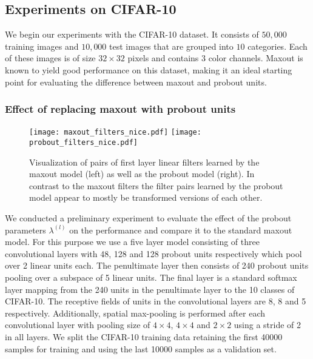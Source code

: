 \documentclass{article} \pdfoutput=1
\begin{document}
\subsection{Experiments on CIFAR-10}
We begin our experiments with the CIFAR-10 \cite{Krizhevsky2009}
dataset. It consists of $50,000$ training images and $10,000$ test
images that are grouped into $10$ categories. Each of these images is
of size $32\times32$ pixels and contains $3$ color channels. Maxout is
known to yield good performance on this dataset, making it an ideal
starting point for evaluating the difference between maxout and
probout units.


\subsubsection{Effect of replacing maxout with probout units}
\label{sect_prelim_eval}
\begin{figure}
\centering
\texttt{[image: maxout\_filters\_nice.pdf]}
\quad
\texttt{[image: probout\_filters\_nice.pdf]}
\caption{Visualization of pairs of first layer linear filters learned by the maxout
  model (left) as well as the probout model (right). In contrast to
  the maxout filters the filter pairs learned by the probout model
  appear to mostly be transformed versions of each other.}
\label{filters_fig}
\end{figure}
We conducted a preliminary experiment to evaluate the effect of the
probout parameters $\lambda^{(l)}$ on the performance and compare it to the
standard maxout model. For this purpose we use a five layer model consisting of
three convolutional layers with 48, 128 and 128 probout units
respectively which pool over 2 linear units each. The penultimate
layer then consists of 240 probout units pooling over a subspace of 5
linear units. The final layer is a standard softmax layer mapping from
the 240 units in the penultimate layer to the 10 classes of CIFAR-10.
The receptive fields of units in the convolutional layers are 8, 8 and
5 respectively. Additionally, spatial max-pooling is performed after
each convolutional layer with pooling size of $4 \times 4$, $4 \times
4$ and $2 \times 2$ using a stride of 2 in all layers.
We split the CIFAR-10 training data retaining the first 40000
samples for training and using the last 10000 samples as a validation
set.
\end{document}
